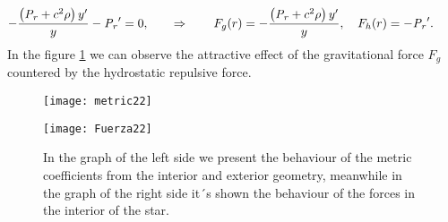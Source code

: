 \documentclass[12pt,onecolumn,a4paper]{article}
\begin{document}
$$
-{\frac { \left( {\it P_r} +c^2\rho  \right) y'}{y }}-{\it P_r}'=0,\qquad 
\Rightarrow \qquad 
F_g(r)=-{\frac { \left( {\it P_r} +c^2\rho  \right) y'}{y }},\quad
F_h(r)=-{\it P_r}'.\qquad
$$
In the figure \ref{metricayfuerza} we can observe the attractive effect of the gravitational force $F_g$ countered by the hydrostatic repulsive force.
\begin{figure}[htb!]
\begin{minipage}[t]{0.43\linewidth}
\centering
\texttt{[image: metric22]}
\end{minipage}
\hspace{0.9cm} 
\begin{minipage}[t]{0.43\linewidth}
\centering
\texttt{[image: Fuerza22]}
\end{minipage}
\caption{In the graph of the left side we present the behaviour of the metric coefficients from the interior and exterior geometry, meanwhile in the graph of the right side it´s shown the behaviour of the forces in the interior of the star.}
\label{metricayfuerza}
\end{figure}
\end{document}
